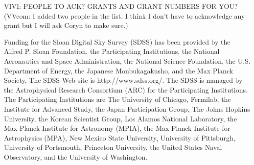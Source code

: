\documentclass[12pt,preprint]{aastex}
\begin{document}
VIVI: PEOPLE TO ACK?  GRANTS AND GRANT NUMBERS FOR YOU? (VVcom: I added 
two people in the list. I think I don't have to acknowledge any grant 
but I will ask Coryn to make sure.)

Funding for the Sloan Digital Sky Survey (SDSS) has been provided by
the Alfred P. Sloan Foundation, the Participating Institutions, the
National Aeronautics and Space Administration, the National Science
Foundation, the U.S. Department of Energy, the Japanese
Monbukagakusho, and the Max Planck Society. The SDSS Web site is
http://www.sdss.org/. The SDSS is managed by the Astrophysical
Research Consortium (ARC) for the Participating Institutions. The
Participating Institutions are The University of Chicago, Fermilab,
the Institute for Advanced Study, the Japan Participation Group, The
Johns Hopkins University, the Korean Scientist Group, Los Alamos
National Laboratory, the Max-Planck-Institute for Astronomy (MPIA),
the Max-Planck-Institute for Astrophysics (MPA), New Mexico State
University, University of Pittsburgh, University of Portsmouth,
Princeton University, the United States Naval Observatory, and the
University of Washington.
\end{document}
